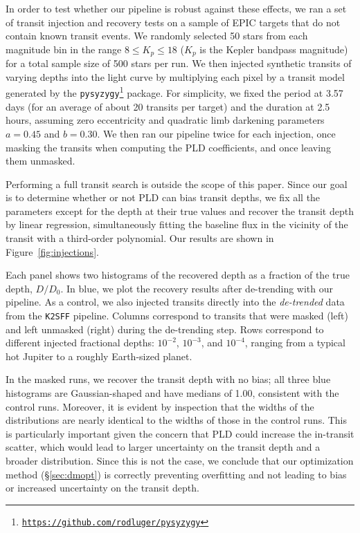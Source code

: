 \documentclass[]{emulateapj}
\begin{document}
In order to test whether our pipeline is robust against these effects, we ran a set
of transit injection and recovery tests on a sample of EPIC
targets that do not contain known transit events. We randomly selected 50 stars from
each magnitude bin in the range $8 \le K_p \le 18$ ($K_p$ is the Kepler bandpass magnitude)
for a total sample size of 500
stars per run. We then injected synthetic transits of varying depths into the
light curve by multiplying each pixel by a transit model generated by the 
\texttt{pysyzygy}\footnote{\texttt{\url{https://github.com/rodluger/pysyzygy}}}
package. For simplicity, we fixed the period at 3.57 days (for an average of about
20 transits per target) and the duration at 2.5 hours, assuming zero eccentricity
and quadratic limb darkening parameters $a = 0.45$ and $b = 0.30$. We then
ran our pipeline twice for each injection, once masking the transits when computing
the PLD coefficients, and once leaving them unmasked.

Performing a full transit search is outside the scope of this paper. Since our 
goal is to determine whether or not PLD can bias transit depths, we fix all the
parameters except for the depth at their true values and recover the transit
depth by linear regression, simultaneously fitting the baseline flux in the
vicinity of the transit with a third-order polynomial. Our results are shown
in Figure~\ref{fig:injections}.

Each panel shows two histograms of the recovered depth as a fraction of the true
depth, $D/D_0$. In blue, we plot the recovery results after de-trending with our pipeline.
As a control, we also injected transits directly into the \emph{de-trended} data from
the \texttt{K2SFF} pipeline. Columns correspond to transits that were masked (left) and
left unmasked (right) during the de-trending step. Rows correspond to different
injected fractional depths: $10^{-2}$, $10^{-3}$, and $10^{-4}$, ranging from a typical 
hot Jupiter to a roughly Earth-sized planet.

In the masked runs, we recover the transit depth with no bias; all three blue histograms
are Gaussian-shaped and have medians of 1.00, consistent with the control runs. Moreover, 
it is evident by inspection that the widths of the distributions are nearly identical
to the widths of those in the control runs. This is particularly important given the
concern that PLD could increase the in-transit scatter, which would lead to larger
uncertainty on the transit depth and a broader distribution. Since this is not the case,
we conclude that our optimization method (\S\ref{sec:dmopt}) is correctly preventing 
overfitting and not leading to bias or increased uncertainty on the transit depth.
\end{document}
